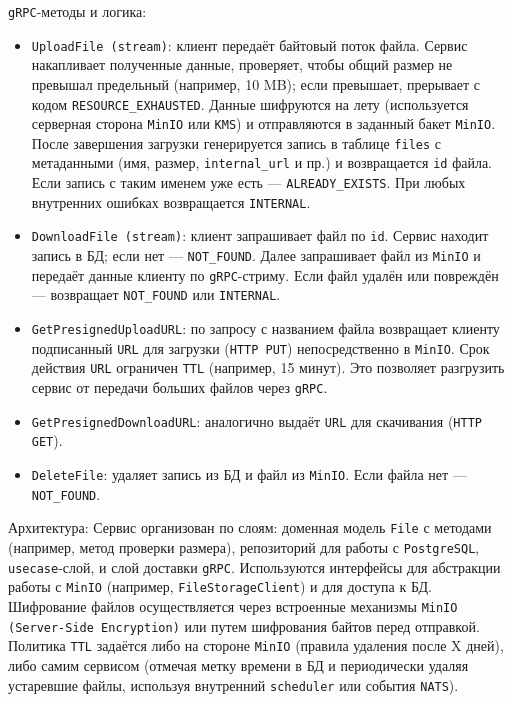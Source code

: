 \texttt{gRPC}-методы и логика:
\begin{itemize}
    \item \texttt{UploadFile (stream)}: клиент передаёт байтовый поток файла. Сервис накапливает полученные данные, проверяет, чтобы общий размер не превышал предельный (например, 10 MB); если превышает, прерывает с кодом \texttt{RESOURCE\_EXHAUSTED}. Данные шифруются на лету (используется серверная сторона \texttt{MinIO} или \texttt{KMS}) и отправляются в заданный бакет \texttt{MinIO}. После завершения загрузки генерируется запись в таблице \texttt{files} с метаданными (имя, размер, \texttt{internal\_url} и пр.) и возвращается \texttt{id} файла. Если запись с таким именем уже есть — \texttt{ALREADY\_EXISTS}. При любых внутренних ошибках возвращается \texttt{INTERNAL}.
    \item \texttt{DownloadFile (stream)}: клиент запрашивает файл по \texttt{id}. Сервис находит запись в БД; если нет — \texttt{NOT\_FOUND}. Далее запрашивает файл из \texttt{MinIO} и передаёт данные клиенту по \texttt{gRPC}-стриму. Если файл удалён или повреждён — возвращает \texttt{NOT\_FOUND} или \texttt{INTERNAL}.
    \item \texttt{GetPresignedUploadURL}: по запросу с названием файла возвращает клиенту подписанный \texttt{URL} для загрузки (\texttt{HTTP PUT}) непосредственно в \texttt{MinIO}. Срок действия \texttt{URL} ограничен \texttt{TTL} (например, 15 минут). Это позволяет разгрузить сервис от передачи больших файлов через \texttt{gRPC}.
    \item \texttt{GetPresignedDownloadURL}: аналогично выдаёт \texttt{URL} для скачивания (\texttt{HTTP GET}).
    \item \texttt{DeleteFile}: удаляет запись из БД и файл из \texttt{MinIO}. Если файла нет — \texttt{NOT\_FOUND}.
\end{itemize}
Архитектура: Сервис организован по слоям: доменная модель \texttt{File} с методами (например, метод проверки размера), репозиторий для работы с \texttt{PostgreSQL}, \texttt{usecase}-слой, и слой доставки \texttt{gRPC}. Используются интерфейсы для абстракции работы с \texttt{MinIO} (например, \texttt{FileStorageClient}) и для доступа к БД. Шифрование файлов осуществляется через встроенные механизмы \texttt{MinIO (Server-Side Encryption)} или путем шифрования байтов перед отправкой. Политика \texttt{TTL} задаётся либо на стороне \texttt{MinIO} (правила удаления после X дней), либо самим сервисом (отмечая метку времени в БД и периодически удаляя устаревшие файлы, используя внутренний \texttt{scheduler} или события \texttt{NATS}).


